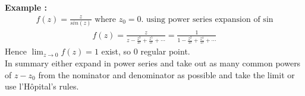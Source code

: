 \textbf{Example : } 
\begin{align*}
    f(z) = \frac{z}{sin(z)} \text{ where }z_0=0. \text{ using power series expansion of sin}
\end{align*}
\begin{align*}
    f(z) = \frac{z}{z-\frac{z^3}{3!}+\frac{z^5}{5!}+\cdots} = \frac{1}{1-\frac{z^2}{3!}+\frac{z^4}{5!}+\cdots}  
\end{align*}
Hence $\lim_{z \rightarrow 0} f(z) = 1$ exist, so $0$ regular point. \\
In summary either expand in power series and take out as many common powers of $z-z_0$ from the nominator and denominator as possible and take the limit or use l'Hôpital's rules. 